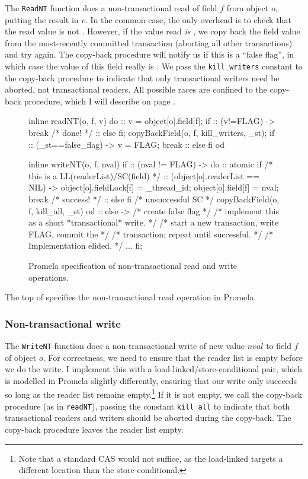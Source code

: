 The {\tt ReadNT} function does a non-transactional read of field $f$ from
object $o$, putting the result in $v$.  
In the common case, the only overhead is to check that
the read value is not \FLAG.  However, if the value read \emph{is}
\FLAG, we copy back the field value 
from the most-recently committed transaction (aborting all other
transactions) and try again.  The copy-back procedure will notify
us if this is a ``false flag'', in which case the value of this
field really is \FLAG.  We pass the {\tt kill\_writers} constant
to the copy-back procedure to
indicate that only transactional writers need be aborted, not
transactional readers.
All possible races are confined to the copy-back procedure, which I
will describe on page \pageref{sec:copyback}.

\begin{figure}
\begin{inlinecode}
inline readNT(o, f, v) {
  do
  :: v = object[o].field[f];
     if
     :: (v!=FLAG) -> break /* done! */
     :: else
     fi;
     copyBackField(o, f, kill_writers, _st);
     if
     :: (_st==false_flag) ->
        v = FLAG;
        break
     :: else
     fi
  od
}

inline writeNT(o, f, nval) {
  if
  :: (nval != FLAG) ->
     do
     :: atomic {
          if /* this is a LL(readerList)/SC(field) */
          :: (object[o].readerList == NIL) ->
             object[o].fieldLock[f] = _thread_id;
             object[o].field[f] = nval;
             break /* success! */
          :: else
          fi
        }
        /* unsuccessful SC */
        copyBackField(o, f, kill_all, _st)
     od
  :: else -> /* create false flag */
     /* implement this as a short *transactional* write. */
     /* start a new transaction, write FLAG, commit the */
     /* transaction; repeat until successful. */
     /* Implementation elided. */
     ...
  fi;
}
\end{inlinecode}
\caption{Promela specification of non-transactional read and write operations.}
\label{fig:promrwnt}
\end{figure}
The top of  specifies the non-transactional read operation in
Promela.

\subsubsection{Non-transactional write}
The {\tt WriteNT} function does a non-transactional write of new value $nval$
to field $f$ of object $o$.  For correctness, we need to ensure that
the reader list is empty before we do the write.  I implement this
with a load-linked/store-conditional pair, which is modelled in
Promela slightly differently, ensuring that our write only succeeds
so long as the reader list remains empty.\footnote{Note that a
  standard CAS would not suffice, as the load-linked targets a
  different location than the store-conditional.}
If it is not empty, we
call the copy-back procedure (as in {\tt readNT}), passing the
constant {\tt kill\_all} to indicate that both transactional readers
and writers should be aborted during the copy-back.  The copy-back
procedure leaves the reader list empty.


